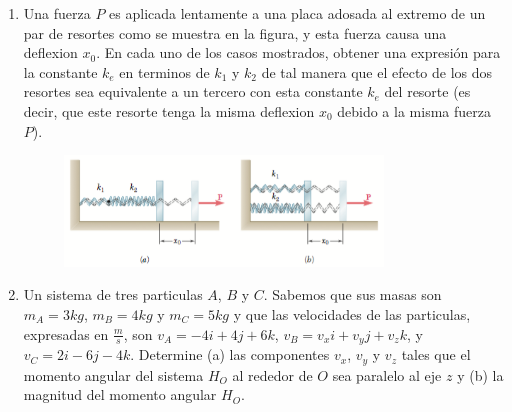 \begin{enumerate}
	\item Una fuerza $P$ es aplicada lentamente a una placa adosada al extremo de un par de resortes como se muestra en la figura, y esta fuerza causa una deflexion $x_0$. En cada uno de los casos mostrados, obtener una expresión para la constante $k_e$ en terminos de $k_1$ y $k_2$ de tal manera que el efecto de los dos resortes sea equivalente a un tercero con esta constante $k_e$ del resorte (es decir, que este resorte tenga la misma deflexion $x_0$ debido a la misma fuerza $P$).

	\begin{figure}[h]
		\begin{center}
			\includegraphics[width=0.8\textwidth]{./images/resortes.png}
		\end{center}
	\end{figure}

	\item Un sistema de tres particulas $A$, $B$ y $C$. Sabemos que sus masas son $m_A = 3 kg$, $m_B = 4 kg$ y $m_C = 5 kg$ y que las velocidades de las particulas, expresadas en $\frac{m}{s}$, son $v_A = -4 i + 4 j + 6 k$, $v_B = v_x i + v_y j + v_z k$, y $v_C = 2i - 6j - 4k$. Determine (a) las componentes $v_x$, $v_y$ y $v_z$ tales que el momento angular del sistema $H_O$ al rededor de $O$ sea paralelo al eje $z$ y (b) la magnitud del momento angular $H_O$.
\end{enumerate}



